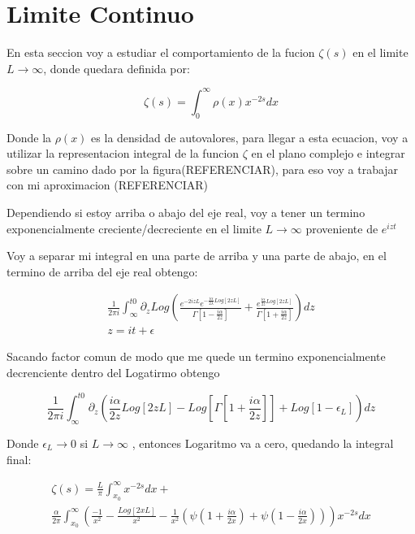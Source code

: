 \chapter{Limite Continuo}

En esta seccion voy a estudiar el comportamiento de la fucion $\zeta (s) $ en el limite $L \rightarrow \infty$, donde quedara definida por:

\begin{equation}
\zeta (s) = \int _{0} ^{\infty} \rho (x) x^{-2 s} dx
\end{equation}

Donde la $\rho(x) $ es la densidad de autovalores, para llegar a esta ecuacion, voy a utilizar la representacion integral de la funcion $\zeta$ en el plano complejo e integrar sobre un camino dado por la figura(REFERENCIAR), para eso voy a trabajar con mi aproximacion (REFERENCIAR)



Dependiendo si estoy arriba o abajo del eje real, voy a tener un termino exponencialmente creciente/decreciente en el limite $L \rightarrow \infty$ proveniente de $e ^{i z t}$

Voy a separar mi integral en una parte de arriba y una parte de abajo, en el termino de arriba del eje real obtengo:

\begin{equation}
\begin{array}{c}
\frac{1}{2 \pi i} \int _{\infty} ^{t0} 
\partial _z
Log
\left(
\frac{e ^{-2 i z  L } e ^{- \frac{i \alpha}{2 \lambda} Log[2 z  L]} }{\Gamma[1-\frac{i \alpha}{2 z }]} +
\frac{e ^{ \frac{i \alpha}{2 z } Log[2 z  L]} }{\Gamma[1+\frac{i \alpha}{2 z }]}
\right) d z \\
z = i t + \epsilon 
\end{array}
\end{equation}

Sacando factor comun de modo que me quede un termino exponencialmente decrenciente dentro del Logatirmo obtengo

\begin{equation}
\frac{1}{2 \pi i}  \int _{\infty} ^{t0} 
\partial _{z}
\left(
\frac{i\alpha}{2 z} Log[2 z L] - Log[\Gamma[1 + \frac{i \alpha}{2 z}]] +
Log[1- \epsilon _L ]
\right)
d z
\end{equation}

Donde $ \epsilon _L \rightarrow 0$ si $L \rightarrow \infty $ , entonces Logaritmo va a cero, quedando la integral final:

\begin{equation}
\begin{array}{c}
\zeta (s) = 
\frac{L}{\pi}
\int _ {x_0} ^{\infty} x ^{-2s} dx + \\
\frac{\alpha}{2 \pi } \int _{x_0} ^{\infty} 
\left(
\frac{-1}{ x ^2} -
\frac{Log[2 x L]}{x ^2}  -
\frac{1}{ x ^2 } 
\left(
\psi (1 + \frac{i \alpha}{2 x}) + \psi (1 - \frac{i \alpha}{2 x}) 
\right)
\right)
x ^{-2s} d x
\end{array}
\end{equation}



